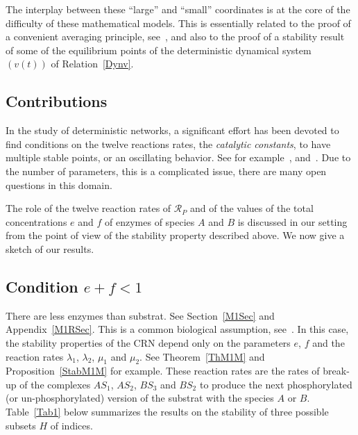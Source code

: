\documentclass[english]{amsart}
\newcommand{\cal}[1]{\ensuremath{\mathcal{#1}}}
\numberwithin{proposition}{section}
\begin{document}
 The interplay between these ``large'' and ``small'' coordinates is at the core of the difficulty of these mathematical models. This is essentially related to the proof of a convenient averaging principle, see~\citet{Kurtz1992}, and also to the proof of a stability result of some of the equilibrium points of the deterministic dynamical system $(v(t))$ of Relation~\eqref{Dynv}.

 \subsection*{Contributions}
 In the study of deterministic networks, a significant effort has been devoted to find conditions on the twelve reactions rates, the {\em catalytic constants},  to have multiple  stable points, or an oscillating behavior. See for example~\citet{Conradi2014}, \citet{Conradi2019}  and~\citet{Conradi2024}. Due to the number of parameters, this is a complicated issue, there are many open questions in this domain. 

 The role of the twelve reaction rates of ${\cal R}_P$  and of the values of the total concentrations $e$ and $f$ of enzymes of species ${ A}$ and ${ B}$  is discussed in our setting from the point of view of the stability property described above. We now give a sketch of our results. 

 \subsection{Condition $e{+}f{<}1$} There are less enzymes than substrat. See Section~\ref{M1Sec} and Appendix~\ref{M1RSec}.  This is a common biological assumption, see~\citet{Albe}. In this case, the stability properties of the CRN depend only on the parameters $e$, $f$ and the reaction rates $\lambda_1$, $\lambda_2$, $\mu_1$ and $\mu_2$. See Theorem~\ref{ThM1M} and Proposition~\ref{StabM1M} for example. These reaction rates are the rates of break-up of the complexes ${ AS}_1$, ${ AS}_2$, ${ BS}_3$ and ${ BS}_2$ to produce the next phosphorylated (or un-phosphorylated) version of the substrat with the species ${ A}$ or ${ B}$. Table~\ref{Tab1} below summarizes the results on the stability of three possible subsets $H$ of indices.
\end{document}
